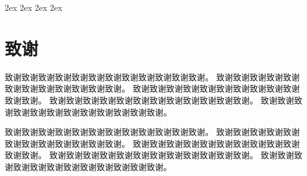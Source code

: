 \documentclass[a4paper,UTF8,twoside,zihao=-4,no-math,linespread=1.65,AutoFakeBold=1.8,AutoFakeSlant=true]{ctexrep}
\renewcommand{\headrulewidth}{0pt}
\begin{document}
\songti			                 %
\abovedisplayskip 2ex			 %
\belowdisplayskip 2ex
\abovedisplayshortskip 2ex
\belowdisplayshortskip 2ex

\begin{titlepage}
\end{titlepage}

\pagestyle{plain}				 %
\clearpage

\begin{center}
	\tableofcontents             %
\end{center}

\clearpage
\fancyhf{}\renewcommand*{\headrulewidth}{0.75bp}
\fancyhead[L]{}
\fancyhead[R]{}
\fancyhead[CE]{\small \leftmark}					  %
\fancyfoot[C]{\thepage}								  %
\pagestyle{fancy}		                              %





\renewcommand*{\bibfont}{\small}
\printbibliography[heading=bibintoc]                  %

\chapter*{致谢}
致谢致谢致谢致谢致谢致谢致谢致谢致谢致谢致谢致谢。
致谢致谢致谢致谢致谢致谢致谢致谢致谢致谢致谢致谢。
致谢致谢致谢致谢致谢致谢致谢致谢致谢致谢致谢致谢。
致谢致谢致谢致谢致谢致谢致谢致谢致谢致谢致谢致谢。
致谢致谢致谢致谢致谢致谢致谢致谢致谢致谢致谢致谢。

致谢致谢致谢致谢致谢致谢致谢致谢致谢致谢致谢致谢。
致谢致谢致谢致谢致谢致谢致谢致谢致谢致谢致谢致谢。
致谢致谢致谢致谢致谢致谢致谢致谢致谢致谢致谢致谢。
致谢致谢致谢致谢致谢致谢致谢致谢致谢致谢致谢致谢。
致谢致谢致谢致谢致谢致谢致谢致谢致谢致谢致谢致谢。

\appendix					    %
\end{document}
